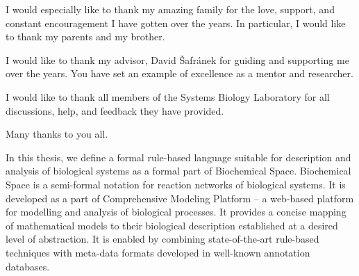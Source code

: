 \documentclass[12pt, twoside]{fithesis2} %
\begin{document}
\FrontMatter
\ThesisTitlePage

\begin{ThesisDeclaration}
\DeclarationText
\AdvisorName
\end{ThesisDeclaration}

\begin{ThesisThanks}
I would especially like to thank my amazing family for the love, support, and constant encouragement I have gotten over the years. 
 In particular, I would like to thank my parents and my brother.

\bigskip

\noindent I would like to thank my advisor, David Šafránek for guiding and 
supporting me over the years. You have set an example of excellence as a mentor and researcher.

\bigskip

\noindent  I would like to thank all members of the Systems Biology Laboratory for all discussions, help, and feedback they have provided.  

\bigskip

\noindent Many thanks to you all.

\end{ThesisThanks}

\begin{ThesisAbstract}
In this thesis, we define a formal rule-based language suitable for description and analysis of biological systems as a formal part of Biochemical Space. Biochemical Space is a semi-formal notation for reaction networks of biological systems. It is developed as a part of Comprehensive Modeling Platform -- a web-based platform for modelling and analysis of biological processes. It provides a concise mapping of mathematical models to their biological description established at a desired level of abstraction. It is enabled by combining state-of-the-art rule-based techniques with meta-data formats developed in well-known annotation databases.
\end{ThesisAbstract}


\end{document}
